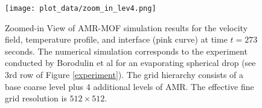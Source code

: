 \documentclass[]{article}
\begin{document}
\begin{figure}[h]
\centering
\texttt{[image: plot\_data/zoom\_in\_lev4.png]}
\caption*{
  Zoomed-in View of AMR-MOF simulation results
  for the velocity field, temperature profile, and
  interface (pink curve) at time $t=273$ seconds.   The numerical
  simulation corresponds to the experiment conducted by
  Borodulin et al\cite{BORODULIN2017} for an evaporating spherical
  drop (see 3rd row of Figure \ref{experiment}).  The grid hierarchy consists
  of a base coarse level plus 4 additional levels of AMR.  The effective
  fine grid resolution is $512\times 512$.
}
\end{figure}
\FloatBarrier

\newpage


\end{document}
